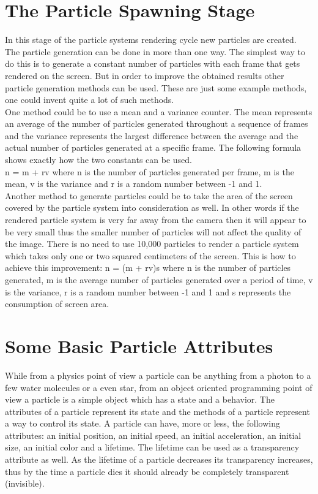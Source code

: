 \newpage
\section{The Particle Spawning Stage}
In this stage of the particle systems rendering cycle new particles are created. The particle generation can be done in more than one way. The simplest way to do this is to generate a constant number of particles with each frame that gets rendered on the screen. But in order to improve the obtained results other particle generation methods can be used. These are just some example methods, one could invent quite a lot of such methods.\\

One method could be to use a mean and a variance counter. The mean represents an average of the number of particles generated throughout a sequence of frames and the variance represents the largest difference between the average and the actual number of particles generated at a specific frame. The following formula shows exactly how the two constants can be used.\\
n = m + rv where n is the number of particles generated per frame, m is the mean, v is the variance and r is a random number between -1 and 1.\\

Another method to generate particles could be to take the area of the screen covered by the particle system into consideration as well. In other words if the rendered particle system is very far away from the camera then it will appear to be very small thus the smaller number of particles will not affect the quality of the image. There is no need to use 10,000 particles to render a particle system which takes only one or two squared centimeters of the screen. This is how to achieve this improvement: n = (m + rv)s where n is the number of particles generated, m is the average number of particles generated over a period of time, v is the variance, r is a random number between -1 and 1 and s represents the consumption of screen area.\\

\newpage
\section{Some Basic Particle Attributes}
While from a physics point of view a particle can be anything from a photon to a few water molecules or a even star, from an object oriented programming point of view a particle is a simple object which has a state and a behavior. The attributes of a particle represent its state and the methods of a particle represent a way to control its state. A particle can have, more or less, the following attributes: an initial position, an initial speed, an initial acceleration, an initial size, an initial color and a lifetime. The lifetime can be used as a transparency attribute as well. As the lifetime of a particle decreases its transparency increases, thus by the time a particle dies it should already be completely transparent (invisible).\\

